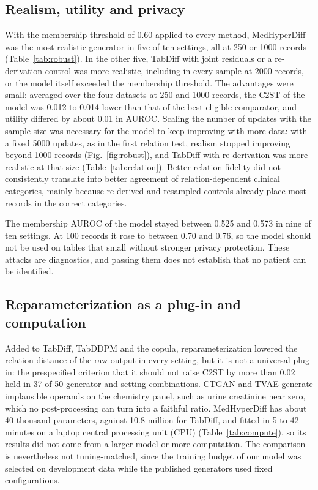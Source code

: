 \documentclass[pdflatex,referee]{sn-jnl}%
\begin{document}
\subsection*{Realism, utility and privacy}

With the membership threshold of 0.60 applied to every method, MedHyperDiff was the most realistic generator in five of ten settings, all at 250 or 1000 records (Table~\ref{tab:robust}). In the other five, TabDiff with joint residuals or a re-derivation control was more realistic, including in every sample at 2000 records, or the model itself exceeded the membership threshold. The advantages were small: averaged over the four datasets at 250 and 1000 records, the C2ST of the model was 0.012 to 0.014 lower than that of the best eligible comparator, and utility differed by about 0.01 in AUROC. Scaling the number of updates with the sample size was necessary for the model to keep improving with more data: with a fixed 5000 updates, as in the first relation test, realism stopped improving beyond 1000 records (Fig.~\ref{fig:robust}), and TabDiff with re-derivation was more realistic at that size (Table~\ref{tab:relation}). Better relation fidelity did not consistently translate into better agreement of relation-dependent clinical categories, mainly because re-derived and resampled controls already place most records in the correct categories.

The membership AUROC of the model stayed between 0.525 and 0.573 in nine of ten settings. At 100 records it rose to between 0.70 and 0.76, so the model should not be used on tables that small without stronger privacy protection. These attacks are diagnostics, and passing them does not establish that no patient can be identified.

\subsection*{Reparameterization as a plug-in and computation}

Added to TabDiff, TabDDPM and the copula, reparameterization lowered the relation distance of the raw output in every setting, but it is not a universal plug-in: the prespecified criterion that it should not raise C2ST by more than 0.02 held in 37 of 50 generator and setting combinations. CTGAN and TVAE generate implausible operands on the chemistry panel, such as urine creatinine near zero, which no post-processing can turn into a faithful ratio. MedHyperDiff has about 40 thousand parameters, against 10.8 million for TabDiff, and fitted in 5 to 42 minutes on a laptop central processing unit (CPU) (Table~\ref{tab:compute}), so its results did not come from a larger model or more computation. The comparison is nevertheless not tuning-matched, since the training budget of our model was selected on development data while the published generators used fixed configurations.
\end{document}
